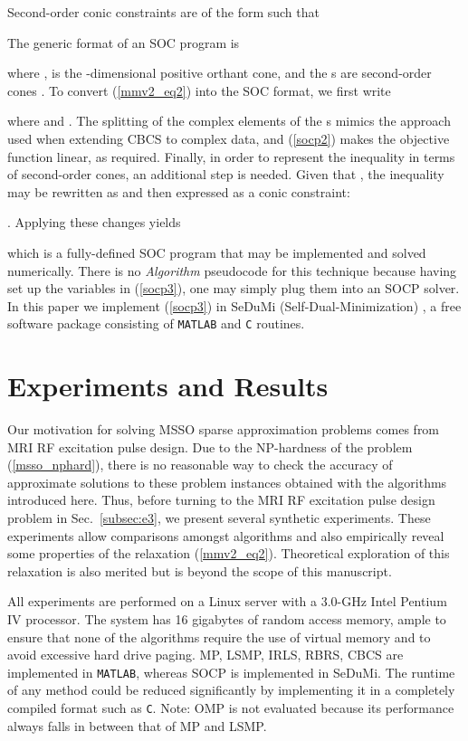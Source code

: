 \documentclass[final]{siamltex}
\begin{document}
    Second-order conic constraints are of the form  such that
    
    The generic format of an SOC program is
    
    where ,  is the -dimensional
    positive orthant cone, and the s are second-order cones
    \cite{Nem2001}.
    To convert (\ref{mmv2_eq2}) into the SOC format, we first write
    
    where  and .  The splitting of the complex elements of
    the s mimics the approach used when extending CBCS to
    complex data, and (\ref{socp2}) makes the objective function
    linear, as required.  Finally, in order to represent the  inequality in
    terms of second-order cones, an additional step is needed.  Given
    that , the inequality
    may be rewritten as  and then expressed as a conic constraint:
    
    \cite{Nem2001,Mal2003}.  Applying these changes yields
    
    which is a fully-defined SOC program that may be implemented and
    solved numerically.  There is no {\em{Algorithm}} pseudocode for
    this technique because having set up the variables in
    (\ref{socp3}), one may simply plug them into an SOCP solver. In
    this paper we implement (\ref{socp3}) in SeDuMi
    (Self-Dual-Minimization) \cite{SeDuMi}, a free software package
    consisting of {\tt{MATLAB}} and {\tt{C}} routines.


\section{Experiments and Results}
\label{sec:experiments}
   Our motivation for solving MSSO sparse approximation problems
   comes from MRI RF excitation pulse design.
   Due to the NP-hardness of the problem (\ref{msso_nphard}),
   there is no reasonable way to check the accuracy of approximate
   solutions to these problem instances obtained with the
   algorithms introduced here.  Thus, before turning to the MRI RF
   excitation pulse design problem in Sec.~\ref{subsec:e3},
   we present several synthetic experiments.  These experiments
   allow comparisons amongst algorithms and also empirically reveal
   some properties of the relaxation (\ref{mmv2_eq2}).
   Theoretical exploration of this relaxation is also merited
   but is beyond the scope of this manuscript.

   All experiments are performed on a Linux server with a 3.0-GHz
   Intel Pentium IV processor.  The system has 16 gigabytes of random
   access memory, ample to ensure that none of the algorithms require
   the use of virtual memory and to avoid excessive hard drive paging.
   MP, LSMP, IRLS, RBRS, CBCS are implemented in {\tt{MATLAB}},
   whereas SOCP is implemented in SeDuMi.  The runtime of any method
   could be reduced significantly by implementing it in a completely
   compiled format such as {\tt{C}}.  Note: OMP is not evaluated
   because its performance always falls in between that of MP and
   LSMP\@.
\end{document}

